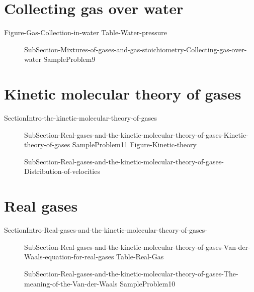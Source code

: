 \documentclass[main.tex]{subfiles}
\newcommand\chapterlabel{Ch-Gas}\setcounter{figurenewcounter}{0}\setcounter{tablenewcounter}{0}\setcounter{formulanewcounter}{0}\chapterpicture{../{\chapterlabel}/figure1}\chapterpicturelabel{PngImg}
\begin{document}
 \section{Collecting gas over water}
 {Figure-Gas-Collection-in-water}
{Table-Water-pressure}
\sloppy 
\begin{description}
\item[]  {SubSection-Mixtures-of-gases-and-gas-stoichiometry-Collecting-gas-over-water}
{SampleProblem9}
\end{description}





 \section{Kinetic molecular theory of gases } {SectionIntro-the-kinetic-molecular-theory-of-gases}
\sloppy \begin{description}
 \item[] {SubSection-Real-gases-and-the-kinetic-molecular-theory-of-gases-Kinetic-theory-of-gases}
{SampleProblem11}
 {Figure-Kinetic-theory}
 \item[] {SubSection-Real-gases-and-the-kinetic-molecular-theory-of-gases-Distribution-of-velocities}
\end{description}
 \section{Real gases }{SectionIntro-Real-gases-and-the-kinetic-molecular-theory-of-gases-}
\sloppy \begin{description}
\item[] {SubSection-Real-gases-and-the-kinetic-molecular-theory-of-gases-Van-der-Waals-equation-for-real-gases}
{Table-Real-Gas}		
\item[]  {SubSection-Real-gases-and-the-kinetic-molecular-theory-of-gases-The-meaning-of-the-Van-der-Waals}
{SampleProblem10}
\end{description}


\clearpage\thispagestyle{empty}\mbox{}\clearpage
\end{document}
